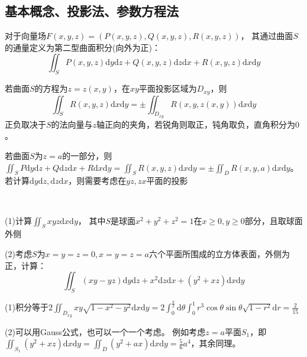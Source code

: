 \subsection{基本概念、投影法、参数方程法}

\begin{definition}[第二型曲面积分]
  对于向量场$F(x,y,z) = (P(x,y,z),Q(x,y,z),R(x,y,z))$，
  其通过曲面$S$的通量定义为第二型曲面积分(向外为正)：
  \begin{equation*}
    \iint _S P(x,y,z)\mathrm{d}y\mathrm{d}z + Q(x,y,z)\mathrm{d}z\mathrm{d}x + R(x,y,z)\mathrm{d}x\mathrm{d}y
  \end{equation*}
\end{definition}

\begin{theorem}[投影法]
  若曲面$S$的方程为$z = z(x,y)$，在$xy$平面投影区域为$D_{xy}$，则
  \begin{equation*}
    \iint_S R(x,y,z) \mathrm{d} x \mathrm{d} y = \pm \iint_{D_{xy}} R(x,y,z(x,y))\mathrm{d} x \mathrm{d} y
  \end{equation*}
  正负取决于$S$的法向量与$z$轴正向的夹角，若锐角则取正，钝角取负，直角积分为$0$。
\end{theorem}

\begin{note}
  若曲面$S$为$z = a$的一部分，则$\iint_S P\mathrm{d}y\mathrm{d}z + Q\mathrm{d}z\mathrm{d}x + R\mathrm{d}x\mathrm{d}y = \iint_S R(x,y,z)\mathrm{d}x\mathrm{d}y = \pm \iint_D R(x,y,a)\mathrm{d} x \mathrm{d} y$。
  若计算$\mathrm{d}y\mathrm{d}z, \mathrm{d}z\mathrm{d}x$，则需要考虑在$yz, zx$平面的投影
\end{note}

~

\begin{exercise}[投影法练习]
  (1)计算$\iint_Sxyz\mathrm{d} x \mathrm{d} y$，
  其中$S$是球面$x^2 + y^2 + z^2 = 1$在$x \geq 0, y\geq 0$部分，且取球面外侧

  (2)考虑$S$为$x=y=z=0, x=y=z=a$六个平面所围成的立方体表面，外侧为正，计算：
  \begin{equation*}
    \iint_S (xy - yz)\mathrm{d}y\mathrm{d}z + x^2\mathrm{d} z \mathrm{d}x + (y^2 + xz)\mathrm{d} x \mathrm{d} y
  \end{equation*}
\end{exercise}

\begin{solution}
  (1)积分等于$2 \iint_{D_{xy}} xy \sqrt{1 - x^2 - y^2}\mathrm{d} x \mathrm{d} y = 2 \int_0^{\frac{\pi}{2}} \mathrm{d} \theta \int_0^1 r^3 \cos \theta \sin \theta \sqrt{1 - r^2}\mathrm{d} r = \frac{2}{15}$
  
  (2)可以用Gauss公式，也可以一个一个考虑。
  例如考虑$z = a$平面$S_1$，即$\iint_{S_1} (y^2 + xz)\mathrm{d} x \mathrm{d} y = \iint_D (y^2 + ax)\mathrm{d} x\mathrm{d} y = \frac{5}{6}a^4$，其余同理。
\end{solution}

